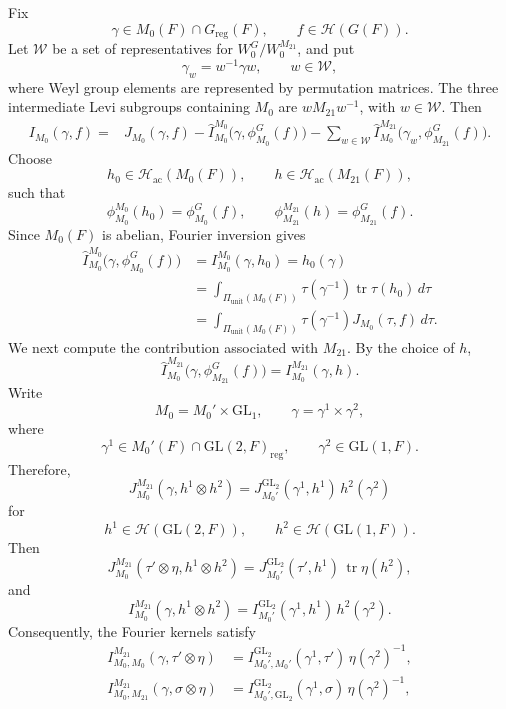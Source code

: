 \documentclass[11pt]{amsart}
\renewcommand{\rm}{\mathrm}
\theoremstyle{definition}
\numberwithin{equation}{section}
\begin{document}
Fix
\[
\gamma\in M_0(F)\cap G_{\mathrm{reg}}(F),
\qquad
f\in\mathcal H(G(F)).
\]
Let \(\mathscr W\) be a set of representatives for
\(W_0^G/W_0^{M_{21}}\), and put
\[
\gamma_w=w^{-1}\gamma w,
\qquad w\in\mathscr W,
\]
where Weyl group elements are represented by permutation matrices.
The three intermediate Levi subgroups containing \(M_0\) are
\(wM_{21}w^{-1}\), with \(w\in\mathscr W\).
Then
\begin{equation}\label{eq:minimal-levi-recursion}
\begin{aligned}
I_{M_0}(\gamma,f)
=&
J_{M_0}(\gamma,f)
-
\widehat I_{M_0}^{M_0}
\bigl(\gamma,\phi_{M_0}^G(f)\bigr)-
\sum_{w\in\mathscr W}
\widehat I_{M_0}^{M_{21}}
\bigl(\gamma_w,\phi_{M_{21}}^G(f)\bigr).
\end{aligned}
\end{equation}
Choose
\[
h_0\in\mathcal{H}_{\rm{ac}}(M_0(F)),
\qquad
h\in\mathcal{H}_{\rm{ac}}(M_{21}(F)),
\]
such that
\[
\phi_{M_0}^{M_0}(h_0)=\phi_{M_0}^G(f),
\qquad
\phi_{M_{21}}^{M_{21}}(h)=\phi_{M_{21}}^G(f).
\]
Since \(M_0(F)\) is abelian, Fourier inversion gives
\begin{equation}\label{eq:minimal-levi-torus-term}
\begin{aligned}
\widehat I_{M_0}^{M_0}
\bigl(\gamma,\phi_{M_0}^G(f)\bigr)
&=
I_{M_0}^{M_0}(\gamma,h_0)
=
h_0(\gamma)\\
&=
\int_{\Pi_{\mathrm{unit}}(M_0(F))}
\tau(\gamma^{-1})\operatorname{tr}\tau(h_0)\,d\tau\\
&=
\int_{\Pi_{\mathrm{unit}}(M_0(F))}
\tau(\gamma^{-1})J_{M_0}(\tau,f)\,d\tau.
\end{aligned}
\end{equation}
We next compute the contribution associated with \(M_{21}\).
By the choice of \(h\),
\[
\widehat I_{M_0}^{M_{21}}
\bigl(\gamma,\phi_{M_{21}}^G(f)\bigr)
=
I_{M_0}^{M_{21}}(\gamma,h).
\]
Write
\[
M_0=M_0'\times\mathrm{GL}_1,
\qquad
\gamma=\gamma^1\times\gamma^2,
\]
where
\[
\gamma^1\in M_0'(F)\cap\mathrm{GL}(2,F)_{\mathrm{reg}},
\qquad
\gamma^2\in\mathrm{GL}(1,F).
\]
Therefore,
\[
J_{M_0}^{M_{21}}(\gamma,h^1\otimes h^2)
=
J_{M_0'}^{\mathrm{GL}_2}(\gamma^1,h^1)\,h^2(\gamma^2)
\]
for
\[
h^1\in\mathcal {H}(\mathrm{GL}(2,F)),
\qquad
h^2\in\mathcal {H}(\mathrm{GL}(1,F)).
\]
Then
\[
J_{M_0}^{M_{21}}
(\tau'\otimes\eta,h^1\otimes h^2)
=
J_{M_0'}^{\mathrm{GL}_2}(\tau',h^1)\,
\operatorname{tr}\eta(h^2),
\]
and
\[
I_{M_0}^{M_{21}}(\gamma,h^1\otimes h^2)
=
I_{M_0'}^{\mathrm{GL}_2}(\gamma^1,h^1)\,h^2(\gamma^2).
\]
Consequently, the Fourier kernels satisfy
\begin{equation}\label{eq:minimal-levi-product-kernels}
\begin{aligned}
I_{M_0,M_0}^{M_{21}}
(\gamma,\tau'\otimes\eta)
&=
I_{M_0',M_0'}^{\mathrm{GL}_2}
(\gamma^1,\tau')\,\eta(\gamma^2)^{-1},\\
I_{M_0,M_{21}}^{M_{21}}
(\gamma,\sigma\otimes\eta)
&=
I_{M_0',\mathrm{GL}_2}^{\mathrm{GL}_2}
(\gamma^1,\sigma)\,\eta(\gamma^2)^{-1},
\end{aligned}
\end{equation}
\end{document}
